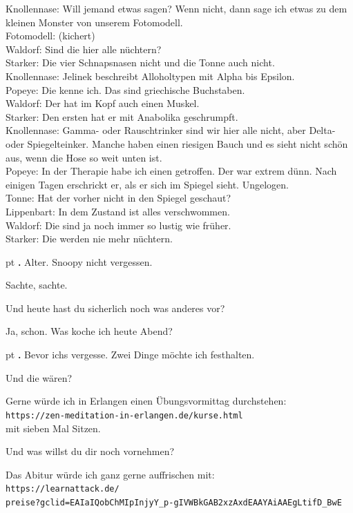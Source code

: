 \documentclass[10pt,a4paper]{article}
\newcounter{notec}
\newcommand\notep[1]{%
  \stepcounter{notec}
  \vskip #1pt
  {\bf\arabic{notec}.}
}
\begin{document}
\begin{mdframed}[style=daystyle]
  \vskip 2pt
  Knollennase: Will jemand etwas sagen? Wenn nicht, dann sage ich etwas zu dem
  kleinen Monster von unserem Fotomodell. \\
  Fotomodell: (kichert) \\
  Waldorf: Sind die hier alle nüchtern? \\
  Starker: Die vier Schnapsnasen nicht und die Tonne auch nicht. \\
  Knollennase: Jelinek beschreibt Alloholtypen mit Alpha bis Epsilon. \\
  Popeye: Die kenne ich. Das sind griechische Buchstaben. \\
  Waldorf: Der hat im Kopf auch einen Muskel. \\
  Starker: Den ersten hat er mit Anabolika geschrumpft. \\
  Knollennase: Gamma- oder Rauschtrinker sind wir hier alle nicht, aber Delta-
  oder Spiegelteinker. Manche haben einen riesigen Bauch und es sieht nicht
  schön aus, wenn die Hose so weit unten ist. \\
  Popeye: In der Therapie habe ich einen getroffen. Der war extrem dünn. Nach
  einigen Tagen erschrickt er, als er sich im Spiegel sieht. Ungelogen. \\
  Tonne: Hat der vorher nicht in den Spiegel geschaut? \\
  Lippenbart: In dem Zustand ist alles verschwommen. \\
  Waldorf: Die sind ja noch immer so lustig wie früher. \\
  Starker: Die werden nie mehr nüchtern.


  \notep 4 Alter. Snoopy nicht vergessen.

  \vskip 2pt
  Sachte, sachte.

  \vskip 2pt
  Und heute hast du sicherlich noch was anderes vor?

  \vskip 2pt
  Ja, schon. Was koche ich heute Abend?


  \notep 4 Bevor ichs vergesse. Zwei Dinge möchte ich festhalten.

  \vskip 2pt
  Und die wären?

  \vskip 2pt
  Gerne würde ich in Erlangen einen Übungsvormittag durchstehen: \\
  \verb+https://zen-meditation-in-erlangen.de/kurse.html+ \\
  mit sieben Mal Sitzen.

  \vskip 2pt
  Und was willst du dir noch vornehmen?

  \vskip 2pt
  Das Abitur würde ich ganz gerne auffrischen mit: \\
  \verb+https://learnattack.de/+ \\
  \verb+preise?gclid=EAIaIQobChMIpInjyY_p-gIVWBkGAB2xzAxdEAAYAiAAEgLtifD_BwE+



\end{mdframed}
\end{document}
